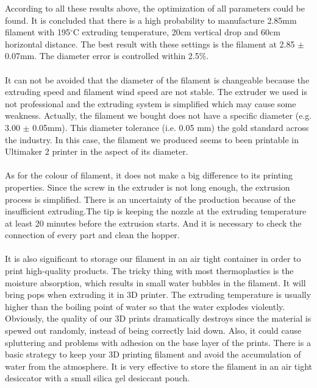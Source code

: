 According to all these results above, the optimization of all parameters could be found. It is concluded that there is a high probability to manufacture 2.85mm filament with 195$^{\circ}$C extruding temperature, 20cm vertical drop and 60cm horizontal distance. The best result with these settings is the filament at 2.85 $\pm$ 0.07mm. The diameter error is controlled within 2.5\%.\\ 
\\
It can not be avoided that the diameter of the filament is changeable because the extruding speed and filament wind speed are not stable. The extruder we used is not professional and the extruding system is simplified which may cause some weakness. Actually, the filament we bought does not have a specific diameter (e.g. 3.00 $\pm$ 0.05mm). This diameter tolerance (i.e. 0.05 mm) the gold standard across the industry. In this case, the filament we produced seems to been printable in Ultimaker 2 printer in the aspect of its diameter.\\
\\
As for the colour of filament, it does not make a big difference to its printing properties. Since the screw in the extruder is not long enough, the extrusion process is simplified. There is an uncertainty of the production because of the insufficient extruding.The tip is keeping the nozzle at the extruding temperature at least 20 minutes before the extrusion starts. And it is necessary to check the connection of every part and clean the hopper.\\
\\
It is also significant to storage our filament in an air tight container in order to print high-quality products\cite{abs}. The tricky thing with most thermoplastics is the moisture absorption, which results in small water bubbles in the filament. It will bring pops when extruding it in 3D printer. The extruding temperature is usually higher than the boiling point of water so that the water explodes violently. Obviously,  the quality of our 3D prints dramatically destroys since the material is spewed out randomly, instead of being correctly laid down. Also, it could cause spluttering and problems with adhesion on the base layer of the prints. There is a basic strategy to keep your 3D printing filament and avoid the accumulation of water from the atmosphere. It is very effective to store the filament in an air tight desiccator with a small silica gel desiccant pouch.\\
